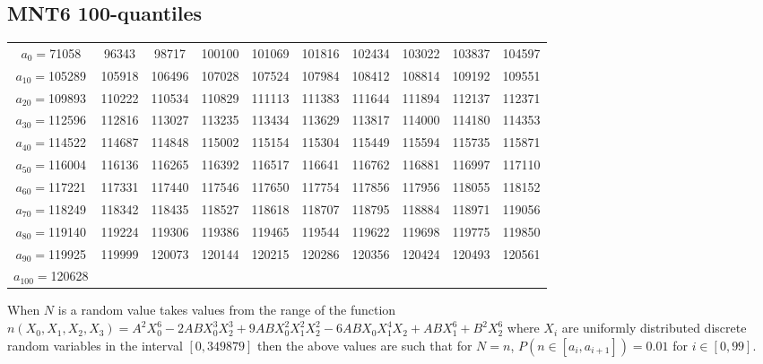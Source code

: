 \documentclass[a4paper, 10pt, envcountsect, runningheads]{lms}
\numberwithin{figure}{section}
\numberwithin{equation}{section}
\begin{document}
\subsection{MNT6 100-quantiles}\label{A:MNT100quantiles}
{\tiny{
\begin{tabular}{cccccccccc}
$a_0=$71058 &96343& 98717&100100&101069&101816&102434&103022&103837&104597\\
$a_{10}=$105289&105918&106496&107028&107524&107984&108412&108814&109192&109551\\
$a_{20}=$109893&110222&110534&110829&111113&111383&111644&111894&112137&112371\\
$a_{30}=$112596&112816&113027&113235&113434&113629&113817&114000&114180&114353\\
$a_{40}=$114522&114687&114848&115002&115154&115304&115449&115594&115735&115871\\
$a_{50}=$116004&116136&116265&116392&116517&116641&116762&116881&116997&117110\\
$a_{60}=$117221&117331&117440&117546&117650&117754&117856&117956&118055&118152\\
$a_{70}=$118249&118342&118435&118527&118618&118707&118795&118884&118971&119056\\
$a_{80}=$119140&119224&119306&119386&119465&119544&119622&119698&119775&119850\\
$a_{90}=$119925&119999& 120073& 120144& 120215& 120286&120356&120424&120493&120561\\
$a_{100}=$120628&&&&&&&&&\\
\end{tabular}
}}
When $N$ is a random value takes values from the range of the function $n(X_0,X_1,X_2,X_3)=A^2 X_0^6 - 2 A B X_0^3 X_2^3 + 9 A B X_0^2 X_1^2 X_2^2 - 6 A B X_0 X_1^4 X_2 + ABX_1^6 + B^2 X_2^6$ where $X_i$ are uniformly distributed discrete random variables in the interval $[0,349879]$ then the above values are such that for $N=n$, $P(n\in[a_i,a_{i+1}])=0.01$ for $i\in[0,99]$.
\end{document}

